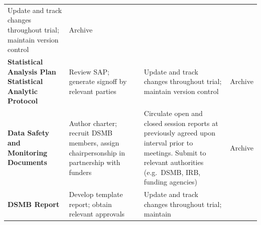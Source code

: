 \documentclass[]{book}
\theoremstyle{definition}
\theoremstyle{definition}
\theoremstyle{definition}
\theoremstyle{remark}
\begin{document}
\begin{longtable}[]{@{}llll@{}}
\begin{minipage}[t]{0.21\columnwidth}
Update and track changes throughout trial; maintain version
control\strut
\end{minipage} & \begin{minipage}[t]{0.25\columnwidth}\raggedright\strut
Archive\strut
\end{minipage}\tabularnewline
\begin{minipage}[t]{0.19\columnwidth}\raggedright\strut
\textbf{Statistical Analysis Plan Statistical Analytic Protocol}\strut
\end{minipage} & \begin{minipage}[t]{0.23\columnwidth}\raggedright\strut
Review SAP; generate signoff by relevant parties\strut
\end{minipage} & \begin{minipage}[t]{0.21\columnwidth}\raggedright\strut
Update and track changes throughout trial; maintain version
control\strut
\end{minipage} & \begin{minipage}[t]{0.25\columnwidth}\raggedright\strut
Archive\strut
\end{minipage}\tabularnewline
\begin{minipage}[t]{0.19\columnwidth}\raggedright\strut
\textbf{Data Safety and Monitoring Documents}\strut
\end{minipage} & \begin{minipage}[t]{0.23\columnwidth}\raggedright\strut
Author charter; recruit DSMB members, assign chairpersonship in
partnership with funders\strut
\end{minipage} & \begin{minipage}[t]{0.21\columnwidth}\raggedright\strut
Circulate open and closed session reports at previously agreed upon
interval prior to meetings. Submit to relevant authorities (e.g.~DSMB,
IRB, funding agencies)\strut
\end{minipage} & \begin{minipage}[t]{0.25\columnwidth}\raggedright\strut
Archive\strut
\end{minipage}\tabularnewline
\begin{minipage}[t]{0.19\columnwidth}\raggedright\strut
\textbf{DSMB Report}\strut
\end{minipage} & \begin{minipage}[t]{0.23\columnwidth}\raggedright\strut
Develop template report; obtain relevant approvals\strut
\end{minipage} & \begin{minipage}[t]{0.21\columnwidth}\raggedright\strut
Update and track changes throughout trial; maintain\strut

\end{minipage}
\end{longtable}
\end{document}
